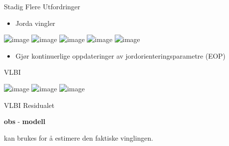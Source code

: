 \documentclass[12pt,table,t]{beamer}
\begin{document}
\begin{frame}[c]{Stadig Flere Utfordringer}

  \begin{itemize}
  \item Jorda vingler
  \end{itemize}
  
  \begin{center}
    \includegraphics<1>[width=0.4\textwidth]{figure/cheers_01}
    \includegraphics<2>[width=0.3\textwidth]{figure/drunk_01}
    \includegraphics<3>[width=0.3\textwidth]{figure/drunk_02}
    \includegraphics<4>[width=0.3\textwidth]{figure/drunk_01}
    \includegraphics<5>[width=0.3\textwidth]{figure/drunk_02}
  \end{center}

  \begin{itemize}
  \item<5-> Gjør kontinuerlige oppdateringer av jordorienteringsparametre (EOP)
  \end{itemize}
\end{frame}


\begin{frame}[c]{VLBI}
  \begin{center}
    \includegraphics<1>[width=\textwidth]{figure/vlbi_concept_01}
    \includegraphics<2>[width=\textwidth]{figure/vlbi_concept_02}
    \includegraphics<3->[width=\textwidth]{figure/vlbi_concept_03}
  \end{center}

\end{frame}


\begin{frame}[c]{VLBI}
  Residualet

  \begin{center}
    \textbf{obs} - \textbf{modell}
  \end{center}

  kan brukes for å estimere den faktiske vinglingen.

\end{frame}
\end{document}
